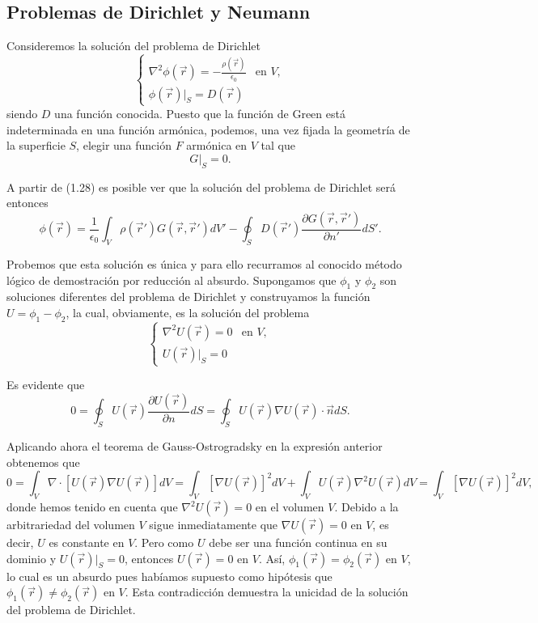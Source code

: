 \documentclass[12pt,a4paper]{book}
\begin{document}
\subsection{Problemas de Dirichlet y Neumann}

Consideremos la solución del problema de Dirichlet
\begin{equation}
\begin{cases}
\nabla^2\phi(\vec{r}) = -\frac{\rho(\vec{r})}{\epsilon_0} & \text{en } V, \\
\phi(\vec{r})|_S = D(\vec{r})
\end{cases}
\end{equation}
siendo $D$ una función conocida. Puesto que la función de Green está indeterminada en una función armónica, podemos, una vez fijada la geometría de la superficie $S$, elegir una función $F$ armónica en $V$ tal que
\begin{equation}
G|_S = 0.
\end{equation}

A partir de (1.28) es posible ver que la solución del problema de Dirichlet será entonces
\begin{equation}
\phi(\vec{r}) = \frac{1}{\epsilon_0} \int_V \rho(\vec{r}')G(\vec{r},\vec{r}') dV' - \oint_S D(\vec{r}') \frac{\partial G(\vec{r},\vec{r}')}{\partial n'} dS'.
\end{equation}

Probemos que esta solución es única y para ello recurramos al conocido método lógico de demostración por reducción al absurdo. Supongamos que $\phi_1$ y $\phi_2$ son soluciones diferentes del problema de Dirichlet y construyamos la función $U = \phi_1 - \phi_2$, la cual, obviamente, es la solución del problema
\begin{equation}
\begin{cases}
\nabla^2U(\vec{r}) = 0 & \text{en } V, \\
U(\vec{r})|_S = 0
\end{cases}
\end{equation}

Es evidente que
\begin{equation}
0 = \oint_S U(\vec{r})\frac{\partial U(\vec{r})}{\partial n} dS = \oint_S U(\vec{r})\nabla U(\vec{r}) \cdot \vec{n}dS.
\end{equation}

Aplicando ahora el teorema de Gauss-Ostrogradsky en la expresión anterior obtenemos que
\begin{equation}
0 = \int_V \nabla \cdot [U(\vec{r})\nabla U(\vec{r})] dV = \int_V [\nabla U(\vec{r})]^2 dV + \int_V U(\vec{r})\nabla^2 U(\vec{r}) dV = \int_V [\nabla U(\vec{r})]^2 dV,
\end{equation}
donde hemos tenido en cuenta que $\nabla^2 U(\vec{r}) = 0$ en el volumen $V$. Debido a la arbitrariedad del volumen $V$ sigue inmediatamente que $\nabla U(\vec{r}) = 0$ en $V$, es decir, $U$ es constante en $V$. Pero como $U$ debe ser una función continua en su dominio y $U(\vec{r})|_S = 0$, entonces $U(\vec{r}) = 0$ en $V$. Así, $\phi_1(\vec{r}) = \phi_2(\vec{r})$ en $V$, lo cual es un absurdo pues habíamos supuesto como hipótesis que $\phi_1(\vec{r}) \neq \phi_2(\vec{r})$ en $V$. Esta contradicción demuestra la unicidad de la solución del problema de Dirichlet.
\end{document}
